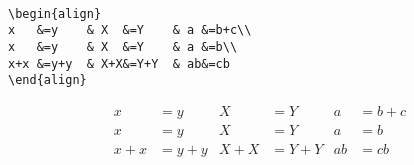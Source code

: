 \raggedright{}\\
\begin{verbatim}
\begin{align}
x   &=y    & X  &=Y    & a &=b+c\\
x   &=y    & X  &=Y    & a &=b\\
x+x &=y+y  & X+X&=Y+Y  & ab&=cb
\end{align}
\end{verbatim}
%
%
\begin{align}
	x   &=y    & X  &=Y    & a &=b+c\\
	x   &=y    & X  &=Y    & a &=b\\
	x+x &=y+y  & X+X&=Y+Y  & ab&=cb
\end{align}
%
%
